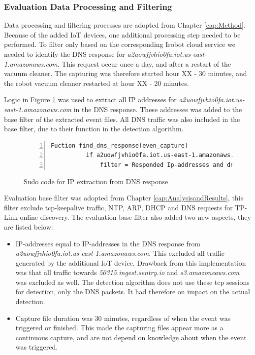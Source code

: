 \subsubsection{Evaluation Data Processing and Filtering}
Data processing and filtering processes are adopted from Chapter \ref{cap:Method}. Because of the added IoT devices, one additional processing step needed to be performed. To filter only based on the corresponding Irobot cloud service we needed to identify the DNS response for \textit{a2uowfjvhio0fa.iot.us-east-1.amazonaws.com}. This request occur once a day, and after a restart of the vacuum cleaner. The capturing was therefore started hour XX - 30 minutes, and the robot vacuum cleaner restarted at hour XX - 20 minutes.

Logic in Figure \ref{fig:Sudo_code_for_IP_extraction_from_DNS_response} was used to extract all IP addresses for \textit{a2uowfjvhio0fa.iot.us-east-1.amazonaws.com} in the DNS response. These addresses was added to the base filter of the extracted event files. All DNS traffic was also included in the base filter, due to their function in the detection algorithm.

\begin{figure}[H]
    \centering
    \caption{Sudo code for IP extraction from DNS response}
    \label{fig:Sudo_code_for_IP_extraction_from_DNS_response}
    \begin{lstlisting}[numbers=left]
        Fuction find_dns_response(even_capture)
          if a2uowfjvhio0fa.iot.us-east-1.amazonaws.com in event_capture
              filter = Responded Ip-addresses and dns
    \end{lstlisting}
 \end{figure}   
 
Evaluation base filter was adopted from Chapter \ref{cap:AnalysisandResults}, this filter exclude tcp-keepalive traffic, NTP, ARP, DHCP and DNS requests for TP-Link online discovery. The evaluation base filter also added two new aspects, they are listed below: 

\begin{itemize}
    \item IP-addresses equal to IP-addresses in the DNS response from \textit{a2uowfjvhio0fa.iot.us-east-1.amazonaws.com}. This excluded all traffic generated by the additional IoT device. Drawback from this implementation was that all traffic towards \textit{50315.ingest.sentry.io} and \textit{s3.amazoneaws.com} was excluded as well. The detection algorithm does not use these tcp sessions for detection, only the DNS packets. It had therefore on impact on the actual detection. 
    \item Capture file duration was 30 minutes, regardless of when the event was triggered or finished. This made the capturing files appear more as a continuous capture, and are not depend on knowledge about when the event was triggered. 
\end{itemize}

